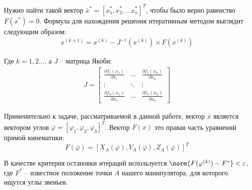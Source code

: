 Нужно найти такой вектор $ \overline{x}^*=[x_1^*, x_2^*, \dots x_n^*]^T $, чтобы было верно равенство $ F(\overline{x}^*) = 0 $. Формула для нахождения решения итеративным методом выглядит следующим образом:
\begin{align*}
    x^{(k+1)}=x^{(k)}-J^{-1}(x^{(k)}) \times F(x^{(k)})
\end{align*}

\noindent Где $ k=1,2\dots $, а $ J $ -- матрица Якоби:
\begin{align*}
    J = \begin{bmatrix}
        \frac{\partial f_1(x_1)}{\partial x_1} & \dots & \frac{\partial f_1(x_n)}{\partial x_n} \\
        \vdots & \ddots & \vdots \\
        \frac{\partial f_n(x_1)}{\partial x_1} & \dots & \frac{\partial f_n(x_n)}{\partial x_n}
    \end{bmatrix}
\end{align*}

Применительно к задаче, рассматриваемой в данной работе, вектор $ \overline{x} $ является  вектором углов $ \overline{\varphi} = [ \varphi_1, \varphi_2, \varphi_3 ]^T $. Вектор $ F(x) $ это правая часть уравнений прямой кинематики:
\begin{equation*}
    F(\overline{\varphi}) = [ X_A(\overline{\varphi}), Y_A(\overline{\varphi}), Z_A(\overline{\varphi}) ]^T
\end{equation*}

\noindent В качестве критерия остановки итераций используется $ \norm{F(\varphi^{(k)}) - F^* } < \varepsilon $, где $ F^* $ -- известное положение точки $ A $ нашего манипулятора, для которого ищутся углы звеньев.

